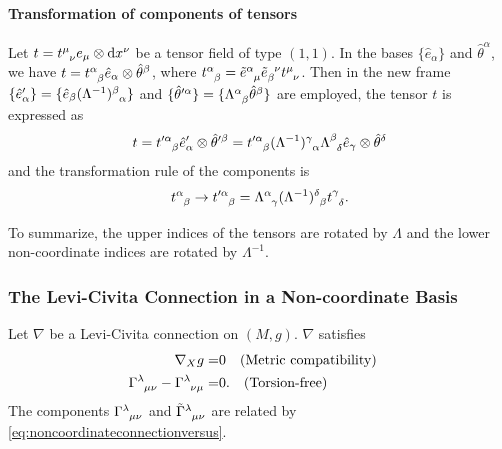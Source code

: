 \documentclass[10pt]{article}
\begin{document}
\paragraph{Transformation of components of tensors}Let $t=\tensor{t}{^\mu_\nu}e_\mu\otimes\dd{x^\nu}$ be a tensor field of type $(1,1)$.
In the bases $\{\hat{e}_\alpha\}$ and $\hat{\theta}^\alpha$, we have $t=\tensor{t}{^\alpha_\beta}\hat{e}_\alpha\otimes\hat{\theta}^\beta$, where $\tensor{t}{^\alpha_\beta}=\tensor{\tilde{e}}{^\alpha_\mu}\tensor{\tilde{e}}{_\beta^\nu}\tensor{t}{^\mu_\nu}$.
Then in the new frame $\{\hat{e}'_\alpha\}=\{\hat{e}_\beta\tensor{(\Lambda^{-1})}{^\beta_\alpha}\}$ and $\{\hat{\theta}'^\alpha\}=\{\tensor{\Lambda}{^\alpha_\beta}\hat{\theta}^\beta\}$ are employed, the tensor $t$ is expressed as
\begin{align}
    t=\tensor{t}{^\prime^\alpha_\beta}\hat{e}'_\alpha\otimes\hat{\theta}'^\beta=\tensor{t}{^\prime^\alpha_\beta}\tensor{(\Lambda^{-1})}{^\gamma_\alpha}\tensor{\Lambda}{^\beta_\delta}\hat{e}_\gamma\otimes\hat{\theta}^\delta
\end{align}
and the transformation rule of the components is
\begin{align}
    \tensor{t}{^\alpha_\beta}\to\tensor{t}{^\prime^\alpha_\beta}=\tensor{\Lambda}{^\alpha_\gamma}\tensor{(\Lambda^{-1})}{^\delta_\beta}\tensor{t}{^\gamma_\delta}.
\end{align}
\begin{property}
    To summarize, the upper indices of the tensors are rotated by $\Lambda$ and the lower non-coordinate indices are rotated by $\Lambda^{-1}$.
\end{property}



\subsubsection{The Levi-Civita Connection in a Non-coordinate Basis}
Let $\nabla$ be a Levi-Civita connection on $(M,g)$.
$\nabla$ satisfies 
\begin{align}
    \nabla_X g=&0\qq{(Metric compatibility)}\label{eq:noncoordimetriccompat}\\
    \tensor{\Gamma}{^\lambda_{\mu\nu}}-\tensor{\Gamma}{^\lambda_{\nu\mu}}=&0.\qq{(Torsion-free)}\label{eq:noncoorditorsionfree}
\end{align}
The components $\tensor{\Gamma}{^\lambda_{\mu\nu}}$ and $\tensor{\tilde{\Gamma}}{^\lambda_{\mu\nu}}$ are related by \eqref{eq:noncoordinateconnectionversus}.
\end{document}

